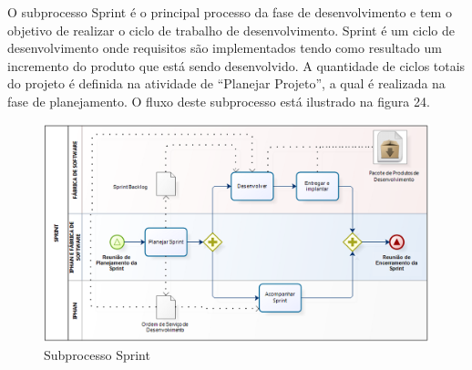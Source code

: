 \begin{anexosenv}
O subprocesso Sprint é o principal processo da fase de desenvolvimento e tem o objetivo de realizar o ciclo de trabalho de desenvolvimento. Sprint é um ciclo de desenvolvimento onde requisitos são implementados tendo como resultado um incremento do produto que está sendo desenvolvido. A quantidade de ciclos totais do projeto é definida na atividade de “Planejar Projeto”, a qual é realizada na fase de planejamento. O fluxo deste subprocesso está ilustrado na figura 24.


\begin{figure}[H]
		\centering
		\label{fig01}
			\includegraphics[scale=0.4]{figuras/subprocessoSprint.png}
		\caption{Subprocesso Sprint \cite{IPHAN:2013}}
\end{figure}

\end{anexosenv}

